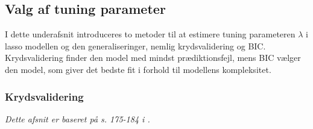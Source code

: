 \subsection{Valg af tuning parameter}
I dette underafsnit introduceres to metoder til at estimere tuning parameteren \(\lambda\) i lasso modellen og den generaliseringer, nemlig krydsvalidering og BIC. 
Krydsvalidering finder den model med mindst prædiktionsfejl, mens BIC vælger den model, som giver det bedste fit i forhold til modellens kompleksitet. 

\subsubsection{Krydsvalidering}
\textit{Dette afsnit er baseret på s. 175-184 i \citep{james}.}



